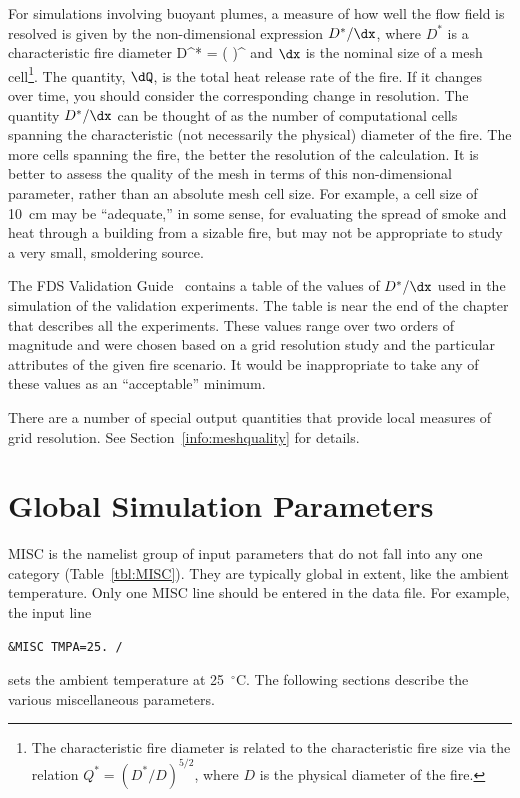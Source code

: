 \documentclass[11pt]{book}
\begin{document}
For simulations involving buoyant plumes, a measure of how well the flow field is resolved is given by the non-dimensional expression $D^*/\dx$, where $D^*$ is a characteristic fire diameter
\be D^* = \left(
     \right)^  \ee
and $\dx$ is the nominal size of a mesh cell\footnote{The characteristic fire diameter is related to the characteristic fire size via the relation $Q^* = (D^*/D)^{5/2}$, where $D$ is the physical diameter of the fire.}. The quantity, $\dQ$, is the total heat release rate of the fire. If it changes over time, you should consider the corresponding change in resolution. The quantity $D^*/\dx$ can be thought of as the number of computational cells spanning the characteristic (not necessarily the physical) diameter of the fire. The more cells spanning the fire, the better the resolution of the calculation. It is better to assess the quality of the mesh in terms of this non-dimensional parameter, rather than an absolute mesh cell size. For example, a cell size of 10~cm may be ``adequate,'' in some sense, for evaluating the spread of smoke and heat through a building from a sizable fire, but may not be appropriate to study a very small, smoldering source.

The FDS Validation Guide~\cite{FDS_Validation_Guide} contains a table of the values of $D^*/\dx$ used in the simulation of the validation experiments. The table is near the end of the chapter that describes all the experiments. These values range over two orders of magnitude and were chosen based on a grid resolution study and the particular attributes of the given fire scenario. It would be inappropriate to take any of these values as an ``acceptable'' minimum.

There are a number of special output quantities that provide local measures of grid resolution. See Section~\ref{info:meshquality} for details.






\chapter{Global Simulation Parameters}
\label{info:MISC}

{\ct MISC} is the namelist group of input parameters that do not fall into any one category (Table~\ref{tbl:MISC}). They are typically global in extent, like the ambient temperature. Only one {\ct MISC} line should be entered in the data file. For example, the input line
\begin{lstlisting}
&MISC TMPA=25. /
\end{lstlisting}
sets the ambient temperature at 25~$^\circ$C. The following sections describe the various miscellaneous parameters.
\end{document}
